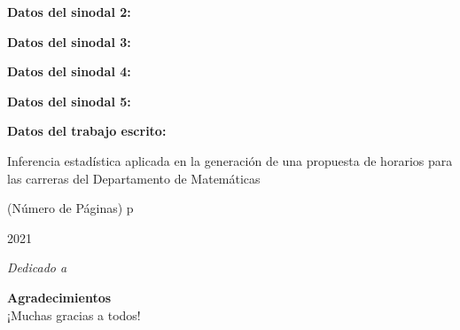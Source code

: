 \textbf{Datos del sinodal 2:}




\textbf{Datos del sinodal 3:}




\textbf{Datos del sinodal 4:}




\textbf{Datos del sinodal 5:}




\textbf{Datos del trabajo escrito:}

Inferencia estadística aplicada en la generación de una propuesta de horarios para las carreras del Departamento de Matemáticas

(Número de Páginas) p

2021




\newpage %
\thispagestyle{empty} %

\begin{flushright}
\textit{Dedicado a \\}
\end{flushright}

\newpage %
\thispagestyle{empty} %

\textbf{\Huge{Agradecimientos}}\\
 
¡Muchas gracias a todos!

\newpage %
\thispagestyle{empty} %

